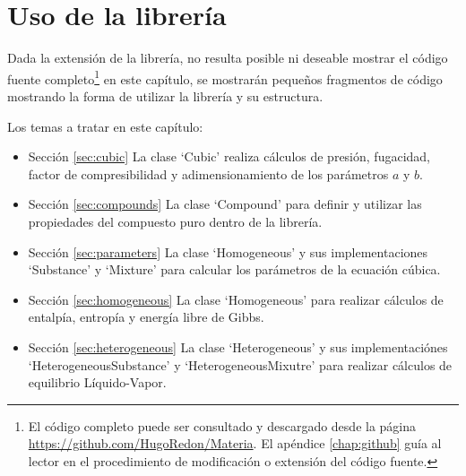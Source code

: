 \chapter{Uso de la librería}\label{chap:libraryUse}
	
	Dada la extensión de la librería, no resulta posible ni deseable mostrar el código fuente completo\footnote{El código completo puede ser consultado y descargado desde la página \url{https://github.com/HugoRedon/Materia}. El apéndice \ref{chap:github} guía al lector en el procedimiento de modificación o extensión del código fuente.} en este capítulo, se mostrarán pequeños fragmentos de código mostrando la forma de utilizar la librería y su estructura.
		
	Los temas a tratar en este capítulo:
	\begin{itemize}
		\item{Sección} \ref{sec:cubic}  La clase `Cubic' realiza cálculos de presión, fugacidad, factor de compresibilidad y adimensionamiento de los parámetros $a$ y $b$.
		\item{Sección} \ref{sec:compounds} La clase `Compound' para definir y utilizar las propiedades del compuesto puro dentro de la librería.
		\item {Sección} \ref{sec:parameters} La clase `Homogeneous' y sus implementaciones `Substance' y `Mixture' para calcular los parámetros de la ecuación cúbica.
		\item {Sección} \ref{sec:homogeneous} La clase `Homogeneous' para realizar cálculos de entalpía, entropía y energía libre de Gibbs.
		\item {Sección} \ref{sec:heterogeneous} La clase `Heterogeneous' y sus implementaciónes `HeterogeneousSubstance' y `HeterogeneousMixutre' para realizar cálculos de equilibrio Líquido-Vapor.

	\end{itemize}
